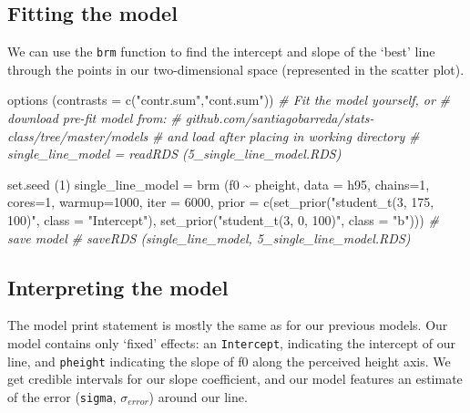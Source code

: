 \documentclass[
]{book}
\newenvironment{Shaded}{\begin{snugshade}}{\end{snugshade}}
\newcommand{\AttributeTok}[1]{\textcolor[rgb]{0.77,0.63,0.00}{#1}}
\newcommand{\CommentTok}[1]{\textcolor[rgb]{0.56,0.35,0.01}{\textit{#1}}}
\newcommand{\DecValTok}[1]{\textcolor[rgb]{0.00,0.00,0.81}{#1}}
\newcommand{\FunctionTok}[1]{\textcolor[rgb]{0.00,0.00,0.00}{#1}}
\newcommand{\NormalTok}[1]{#1}
\newcommand{\OtherTok}[1]{\textcolor[rgb]{0.56,0.35,0.01}{#1}}
\newcommand{\SpecialCharTok}[1]{\textcolor[rgb]{0.00,0.00,0.00}{#1}}
\newcommand{\StringTok}[1]{\textcolor[rgb]{0.31,0.60,0.02}{#1}}
\begin{document}
\hypertarget{fitting-the-model-3}{%
\subsection{Fitting the model}\label{fitting-the-model-3}}

We can use the \texttt{brm} function to find the intercept and slope of the `best' line through the points in our two-dimensional space (represented in the scatter plot).

\begin{Shaded}
\begin{Highlighting}[]
\FunctionTok{options}\NormalTok{ (}\AttributeTok{contrasts =} \FunctionTok{c}\NormalTok{(}\StringTok{"contr.sum"}\NormalTok{,}\StringTok{"cont.sum"}\NormalTok{))}
\CommentTok{\# Fit the model yourself, or}
\CommentTok{\# download pre{-}fit model from: }
\CommentTok{\# github.com/santiagobarreda/stats{-}class/tree/master/models}
\CommentTok{\# and load after placing in working directory}
\CommentTok{\# single\_line\_model = readRDS (\textquotesingle{}5\_single\_line\_model.RDS\textquotesingle{})}

\FunctionTok{set.seed}\NormalTok{ (}\DecValTok{1}\NormalTok{)}
\NormalTok{single\_line\_model }\OtherTok{=}
  \FunctionTok{brm}\NormalTok{ (f0 }\SpecialCharTok{\textasciitilde{}}\NormalTok{ pheight, }\AttributeTok{data =}\NormalTok{ h95, }\AttributeTok{chains=}\DecValTok{1}\NormalTok{, }\AttributeTok{cores=}\DecValTok{1}\NormalTok{,  }\AttributeTok{warmup=}\DecValTok{1000}\NormalTok{, }\AttributeTok{iter =} \DecValTok{6000}\NormalTok{,}
       \AttributeTok{prior =} \FunctionTok{c}\NormalTok{(}\FunctionTok{set\_prior}\NormalTok{(}\StringTok{"student\_t(3, 175, 100)"}\NormalTok{, }\AttributeTok{class =} \StringTok{"Intercept"}\NormalTok{),}
                 \FunctionTok{set\_prior}\NormalTok{(}\StringTok{"student\_t(3, 0, 100)"}\NormalTok{, }\AttributeTok{class =} \StringTok{"b"}\NormalTok{)))}
\CommentTok{\# save model}
\CommentTok{\# saveRDS (single\_line\_model, \textquotesingle{}5\_single\_line\_model.RDS\textquotesingle{})}
\end{Highlighting}
\end{Shaded}

\hypertarget{interpreting-the-model-2}{%
\subsection{Interpreting the model}\label{interpreting-the-model-2}}

The model print statement is mostly the same as for our previous models. Our model contains only `fixed' effects: an \texttt{Intercept}, indicating the intercept of our line, and \texttt{pheight} indicating the slope of f0 along the perceived height axis. We get credible intervals for our slope coefficient, and our model features an estimate of the error (\texttt{sigma}, \(\sigma_{error}\)) around our line.
\end{document}
